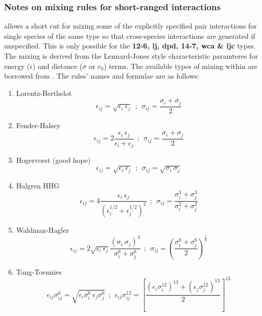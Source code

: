 \subsubsection*{Notes on mixing rules for short-ranged interactions}

\D allows a short cut for mixing some of the explicitly specified
pair interactions for single species of the same type so that
cross-species interactions are generated if unspecified.  This is
only possible for the {\bf 12-6, lj, dpd, 14-7, wca \& ljc} types.
The mixing is derived from the Lennard-Jones style characteristic
paramteres for energy ($\epsilon$) and distance ($\sigma$ or $r_{0}$)
terms.  The available types of mixing within \D are borrowed from
\cite{al-matar-04a}. The rules' names and formulae are as follows:
\begin{enumerate}
\item Lorentz-Berthelot
\begin{equation}
\epsilon_{ij} = \sqrt{\epsilon_{i}~\epsilon_{j}}~~;~~\sigma_{ij} = \frac{\sigma_{i}+\sigma_{j}}{2}
\end{equation}
\item Fender-Halsey
\begin{equation}
\epsilon_{ij} = 2 \frac{\epsilon_{i}~\epsilon_{j}}{\epsilon_{i}+\epsilon_{j}}~~;~~\sigma_{ij} = \frac{\sigma_{i}+\sigma_{j}}{2}
\end{equation}
\item Hogervorst (good hope)
\begin{equation}
\epsilon_{ij} = \sqrt{\epsilon_{i}~\epsilon_{j}}~~;~~\sigma_{ij} = \sqrt{\sigma_{i}~\sigma_{j}}
\end{equation}
\item Halgren HHG
\begin{equation}
\epsilon_{ij} = 4 \frac{\epsilon_{i}~\epsilon_{j}}{\left(\epsilon_{i}^{1/2}+\epsilon_{j}^{1/2}\right)^{2}}~~;~~\sigma_{ij} = \frac{\sigma_{i}^{3}+\sigma_{j}^{3}}{\sigma_{i}^{2}+\sigma_{j}^{2}}
\end{equation}
\item Waldman-Hagler
\begin{equation}
\epsilon_{ij} = 2 \sqrt{\epsilon_{i}~\epsilon_{j}} \frac{(\sigma_{i}~\sigma_{j})^{3}}{\sigma_{i}^{6}+\sigma_{j}^{6}}~~;~~\sigma_{ij} = \left(\frac{\sigma_{i}^{6}+\sigma_{j}^{6}}{2}\right)^{\frac{1}{6}}
\end{equation}
\item Tang-Toennies
\begin{equation}
\epsilon_{ij} \sigma_{ij}^{6} = \sqrt{\epsilon_{i} \sigma_{i}^{6}~\epsilon_{j} \sigma_{j}^{6}}~~;~~\epsilon_{ij} \sigma_{ij}^{12}=\left[\frac{\left(\epsilon_{i} \sigma_{i}^{12}\right)^{13}+\left(\epsilon_{j} \sigma_{j}^{12}\right)^{13}}{2}\right]^{13}

\end{equation}
\end{enumerate}
